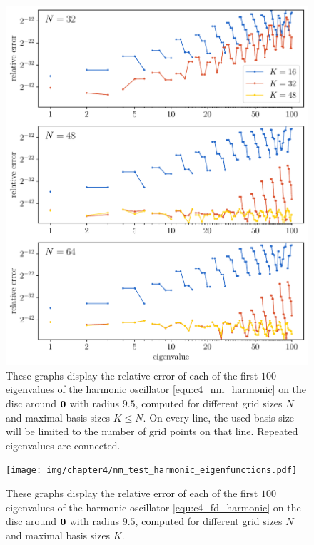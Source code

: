 \begin{figure}
    \begin{center}
        \includegraphics[width=\textwidth]{img/chapter4/nm_test_harmonic_disc.pdf}
    \end{center}
    \caption{These graphs display the relative error of each of the first $100$ eigenvalues of the harmonic oscillator \eqref{equ:c4_nm_harmonic} on the disc around $\vb{0}$ with radius $9.5$, computed for different grid sizes $N$ and maximal basis sizes $K \leq N$. On every line, the used basis size will be limited to the number of grid points on that line. Repeated eigenvalues are connected.}
    \label{fig:c4_nm_harmonic_disc}
\end{figure}


\begin{figure}
    \begin{center}
        \texttt{[image: img/chapter4/nm\_test\_harmonic\_eigenfunctions.pdf]}
    \end{center}
    \caption{These graphs display the relative error of each of the first $100$ eigenvalues of the harmonic oscillator \eqref{equ:c4_fd_harmonic} on the disc around $\vb{0}$ with radius $9.5$, computed for different grid sizes $N$ and maximal basis sizes $K$.}
    \label{fig:c4_nm_harmonic_eigenfunctions}
\end{figure}

